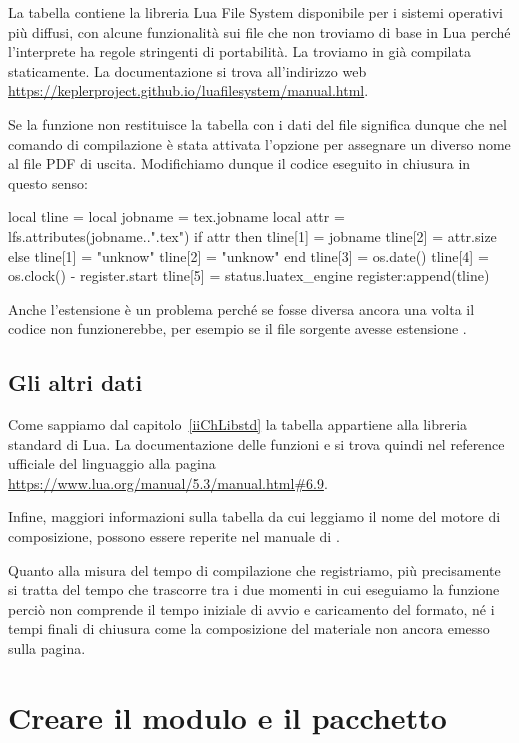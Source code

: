 La tabella  contiene la libreria Lua File System disponibile per i
sistemi operativi più diffusi, con alcune funzionalità sui file che non troviamo
di base in Lua perché l'interprete ha regole stringenti di portabilità. La
troviamo in \LuaTeX{} già compilata staticamente. La documentazione si trova
all'indirizzo web
\url{https://keplerproject.github.io/luafilesystem/manual.html}.

Se la funzione  non restituisce la tabella con i dati del
file significa dunque che nel comando di compilazione è stata attivata l'opzione
 per assegnare un diverso nome al file PDF di uscita.
Modifichiamo dunque il codice eseguito in chiusura in questo senso:
\begin{lines}
local tline = {}
local jobname = tex.jobname
local attr = lfs.attributes(jobname..".tex")
if attr then
    tline[1] = jobname
    tline[2] = attr.size
else
    tline[1] = "unknow"
    tline[2] = "unknow"    
end
tline[3] = os.date()
tline[4] = os.clock() - register.start
tline[5] = status.luatex_engine
register:append(tline)
\end{lines}

Anche l'estensione  è un problema perché se fosse diversa ancora una
volta il codice non funzionerebbe, per esempio se il file sorgente avesse
estensione .


\subsection{Gli altri dati}

Come sappiamo dal capitolo~\ref{iiChLibstd} la tabella  appartiene alla
libreria standard di Lua. La documentazione delle funzioni  e
 si trova quindi nel reference ufficiale del linguaggio alla pagina
\url{https://www.lua.org/manual/5.3/manual.html#6.9}.

Infine, maggiori informazioni sulla tabella  da cui leggiamo il nome
del motore di composizione, possono essere reperite nel manuale di \LuaTeX{}.

Quanto alla misura del tempo di compilazione che registriamo, più precisamente
si tratta del tempo che trascorre tra i due momenti in cui eseguiamo la funzione
 perciò non comprende il tempo iniziale di avvio e caricamento del
formato, né i tempi finali di chiusura come la composizione del materiale non
ancora emesso sulla pagina.


\section{Creare il modulo e il pacchetto}

